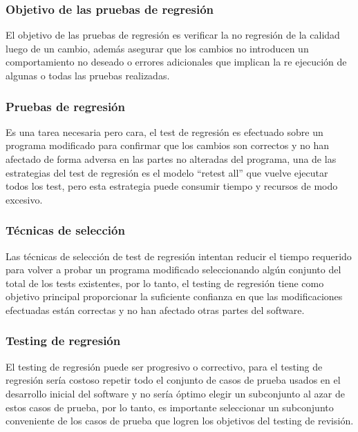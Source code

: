 \documentclass[conference]{IEEEtran}
\begin{document}
\subsubsection{Objetivo de las pruebas de regresión}
 
 El objetivo de las pruebas de regresión es verificar la no regresión de la calidad luego de un cambio, además asegurar que los cambios no introducen un comportamiento no deseado o errores adicionales que implican la re ejecución de algunas o todas las pruebas realizadas. 
 
\subsubsection{Pruebas de regresión}

Es una tarea necesaria pero cara, el test de regresión es efectuado sobre un programa modificado para confirmar que los cambios son correctos y no han afectado de forma adversa en las partes no alteradas del programa, una de las estrategias del test de regresión es el modelo “retest all” que vuelve ejecutar todos los test, pero esta estrategia puede consumir tiempo y recursos de modo excesivo.

\subsubsection{Técnicas de selección}

 Las técnicas de selección de test de regresión intentan reducir el tiempo requerido para volver a probar un programa modificado seleccionando algún conjunto del total de los tests existentes, por lo tanto, el testing de regresión tiene como objetivo principal proporcionar la suficiente confianza en que las modificaciones efectuadas están correctas y no han afectado otras partes del software.
 
\subsubsection{Testing de regresión}

 El testing de regresión puede ser progresivo o correctivo, para el testing de regresión sería costoso repetir todo el conjunto de casos de prueba usados en el desarrollo inicial del software y no sería óptimo elegir un subconjunto al azar de estos casos de prueba, por lo tanto, es importante seleccionar un subconjunto conveniente de los casos de prueba que logren los objetivos del testing de revisión.
\end{document}
